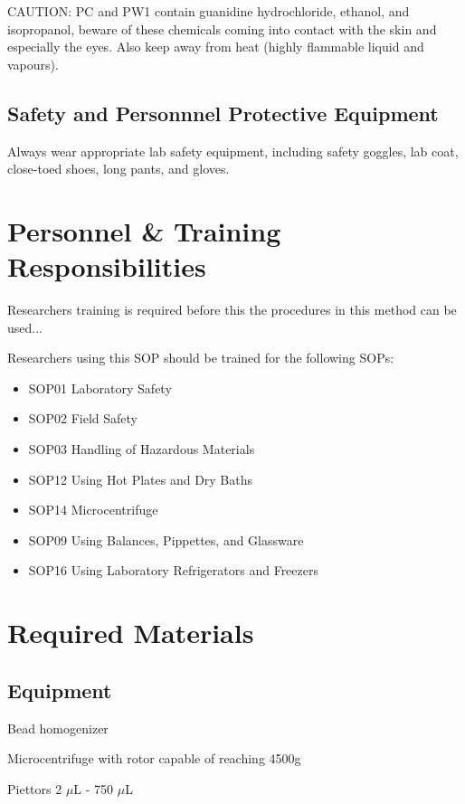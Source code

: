 \documentclass[12pt]{../SOP3_alpha}
\begin{document}
\NP CAUTION: PC and PW1 contain guanidine hydrochloride, ethanol, and isopropanol, beware of these chemicals coming into contact with the skin and especially the eyes. Also keep away from heat (highly flammable liquid and vapours).

\subsection {Safety and Personnnel Protective Equipment}

\NP Always wear appropriate lab safety equipment, including safety goggles, lab coat, close-toed shoes, long pants, and gloves. 

\section{Personnel \& Training Responsibilities}

\NP Researchers training is required before this the procedures in this method can be used... 

\NP Researchers using this SOP should be trained for the following SOPs:

\begin{itemize}
  \item SOP01 Laboratory Safety
  \item SOP02 Field Safety
  \item SOP03 Handling of Hazardous Materials
  \item SOP12 Using Hot Plates and Dry Baths
  \item SOP14 Microcentrifuge
  \item SOP09 Using Balances, Pippettes, and Glassware
  \item SOP16 Using Laboratory Refrigerators and Freezers
\end{itemize}


\section{Required Materials}

\subsection*{Equipment}

\NP Bead homogenizer

\NP Microcentrifuge with rotor capable of reaching 4500g

\NP Piettors 2 $\mu$L - 750 $\mu$L
\end{document}
